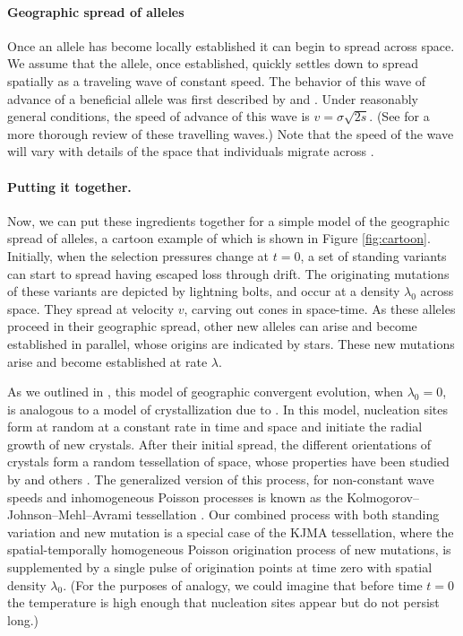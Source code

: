 \documentclass{article}
\begin{document}
\paragraph{Geographic spread of alleles} 
Once an allele has become locally established it can begin to spread across space. 
We assume that the allele, once established, 
quickly settles down to spread spatially as a traveling wave of constant speed. 
The behavior of this wave of advance of a beneficial allele was first described by 
\citet{fisher1937wave} and \citet*{KPP1937}. 
Under reasonably general conditions, the speed of advance of this wave is $v = \sigma \sqrt{2s}$. 
(See \citet{ralphcoop2010} for a more thorough review of these travelling waves.)
Note that the speed of the wave will vary
with details of the space that individuals migrate across
\citep[e.g.\ see ][ for comparisons to migration on discrete grids]{Slatkin-speed:76,SlatkinCharlesworth:78}.

\paragraph{Putting it together.}
Now, we can put these ingredients together for a simple model of the geographic spread of alleles, 
a cartoon example of which is shown in Figure \ref{fig:cartoon}. 
Initially, when the selection pressures change at $t=0$, 
a set of standing variants can start to spread having escaped loss through drift. 
The originating mutations of these variants are depicted by lightning bolts, and occur at a density $\lambda_0$ across space. 
They spread at velocity $v$, carving out cones in space-time. 
As these alleles proceed in their geographic spread, other new alleles can arise and become established in parallel, 
whose origins are indicated by stars.
These new mutations arise and become established at rate $\lambda$.

As we outlined in \citet{ralphcoop2010}, this model of
geographic convergent evolution, when $\lambda_0=0$, is analogous to a model of crystallization due to \citet{kolmogorov-crystallization}.
In this model, nucleation sites form at random at a constant rate in time and space 
and initiate the radial growth of new crystals. 
After their initial spread, the different orientations of crystals form a random tessellation of space,
whose properties have been studied by \citet{moller92,moller95} and others \citep{bollobas-crystallization,gilbert-crystallization}. 
The generalized version of this process, for non-constant wave speeds
and inhomogeneous Poisson processes is known as the 
Kolmogorov--Johnson--Mehl--Avrami tessellation \citep{fanfoni-tomellini}.
Our combined process with both standing variation and new mutation is
a special case of the KJMA tessellation, 
where the spatial-temporally homogeneous Poisson origination process of new mutations, 
is supplemented by a single pulse of origination points at time zero with spatial density $\lambda_0$.
(For the purposes of analogy, we could imagine that before time $t=0$
the temperature is high enough that nucleation sites appear but do not persist long.)
\end{document}
